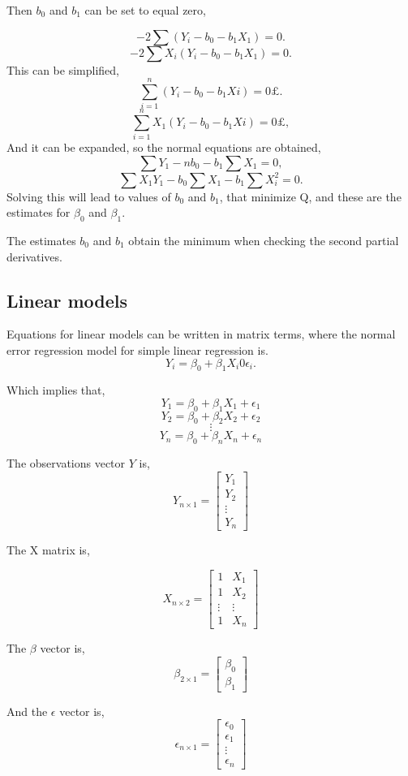 	Then $b_0$ and $b_1$ can be set to equal zero, 
	
	$$-2 \sum (Y_i - b_0 - b_1 X_1)=0.$$
	$$-2\sum X_i(Y_i - b_0 - b_1 X_1)=0.$$
	This can be simplified, 
	$$\sum_{i=1}^{n} (Y_i - b_0 - b_1 Xi)=0£.$$
	$$\sum_{i=1}^{n} X_1(Y_i - b_0 - b_1 Xi)=0£,$$
	And it can be expanded, so the normal equations are obtained, 
	$$\sum Y_1 - n b_0 - b_1 \sum X_1 =0,$$
	$$\sum X_1 Y_1  - b_0 \sum X_1 - b_1 \sum X_i^2 =0.$$
	Solving this will lead to values of $b_0$ and $b_1$, that minimize Q, and these are the estimates for $\beta_0$ and $\beta_1$. 
	
	The estimates $b_0$ and $b_1$ obtain the minimum when checking the second partial derivatives. \newline
	
	
	\subsection{Linear models}
	
	Equations for linear models can be written in matrix terms, where the normal error regression model for simple linear regression is.
	$$Y_i = \beta_0 + \beta_1 X_i 0 \epsilon_i. $$ 
	
	
	Which implies that,
	$$Y_1 = \beta_0 + \beta_1 X_1 + \epsilon_1$$
	$$Y_2 = \beta_0 + \beta_2 X_2 + \epsilon_2$$
	$$\vdots$$
	$$Y_n = \beta_0 + \beta_n X_n + \epsilon_n$$
	
	The observations vector $Y$ is,
	$$ Y_{n \times 1} =
	\left[
	\begin{array}{c}
		Y_1 \\ 
		Y_2 \\ 
		\vdots \\
		Y_n 
	\end{array}
	\right]
	$$	
	
	The X matrix is, 
	
	$$X_{n \times 2}=
	\left[
	\begin{array}{cc}
		1 & X_1 \\ 
		1 & X_2 \\ 
		\vdots & \vdots \\
		1 & X_n
	\end{array}
	\right]
	$$
	
	
	The $\beta$ vector is, 
	$$ \beta_{2 \times 1} =
	\left[
	\begin{array}{c}
		\beta_0 \\ 
		\beta_1 
	\end{array}
	\right]
	$$
	
	And the $\epsilon$ vector is,
	$$ \epsilon_{n \times 1} =
	\left[
	\begin{array}{c}
		\epsilon_0 \\ 
		\epsilon_1 \\
		\vdots \\
		\epsilon_n 
	\end{array}
	\right]
	$$
	
